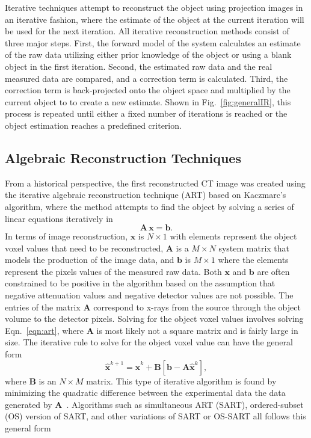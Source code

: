 Iterative techniques attempt to reconstruct the object using projection images in an iterative fashion, where the estimate of the object at the current iteration will be used for the next iteration.  All iterative reconstruction methods consist of three major steps.  First, the forward model of the system calculates an estimate of the raw data utilizing either prior knowledge of the object or using a blank object in the first iteration.  Second, the estimated raw data and the real measured data are compared, and a correction term is calculated.  Third, the correction term is back-projected onto the object space and multiplied by the current object to to create a new estimate.  Shown in Fig.~\ref{fig:generalIR}, this process is repeated until either a fixed number of iterations is reached or the object estimation reaches a predefined criterion.

\subsection{Algebraic Reconstruction Techniques}

From a historical perspective, the first reconstructed CT image was created using the iterative algebraic reconstruction technique (ART) based on Kaczmarc's algorithm, where the method attempts to find the object by solving a series of linear equations iteratively in
%
\begin{equation}
\mathbf{A}\,\mathbf{x} = \mathbf{b}.
\label{eqn:art}
\end{equation}
%
In terms of image reconstruction, $\mathbf{x}$ is $N \times 1$ with elements represent the object voxel values that need to be reconstructed, $\mathbf{A}$ is a $M \times N$ system matrix that models the production of the image data, and $\mathbf{b}$ is $M\times 1$ where the elements represent the pixels values of the measured raw data.  Both $\mathrm{\mathbf{x}}$ and $\mathrm{\mathbf{b}}$ are often constrained to be positive in the algorithm based on the assumption that negative attenuation values and negative detector values are not possible.  The entries of the matrix $\mathbf{A}$ correspond to x-rays from the source through the object volume to the detector pixels.  Solving for the object voxel values involves solving Eqn.~\ref{eqn:art}, where $\mathbf{A}$ is most likely not a square matrix and is fairly large in size.  The iterative rule to solve for the object voxel value can have the general form
%
\begin{equation}
\mathbf{\hat{x}}^{k+1} = \mathbf{\hat{x}}^{k} + \mathbf{B}[\mathbf{b} - \mathbf{A} \mathbf{\hat{x}}^k],
\end{equation}
%
where $\mathbf{B}$ is an $N \times M$ matrix.  This type of iterative algorithm is found by minimizing the quadratic difference between the  experimental data the data generated by $\mathbf{A}$~\citep{Barrett2004}.  Algorithms such as simultaneous ART (SART), ordered-subset (OS) version of SART, and other variations of SART or OS-SART all follows this general form~\citep{Yu2011, Wang2004} 


